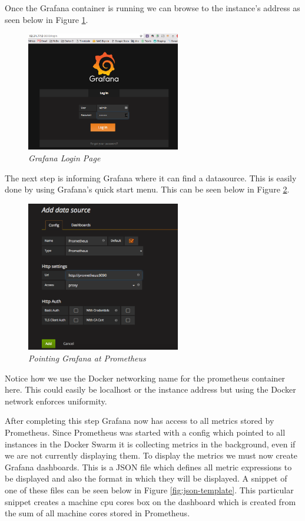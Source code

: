 Once the Grafana container is running we can browse to the instance's address as seen below in Figure \ref{fig:grafana}.

\begin{figure}[!h]
\centering
\includegraphics*[width=0.6\textwidth]{components/images/grafana}
\caption{\em Grafana Login Page}
\label{fig:grafana}
\end{figure}

The next step is informing Grafana where it can find a datasource. This is easily done by using Grafana's quick start menu. This can be seen below in Figure \ref{fig:add-source}.

\begin{figure}[!h]
\centering
\includegraphics*[width=0.6\textwidth]{components/images/add-source}
\caption{\em Pointing Grafana at Prometheus}
\label{fig:add-source}
\end{figure}

Notice how we use the Docker networking name for the prometheus container here. This could easily be localhost or the instance address but using the Docker network enforces uniformity.

After completing this step Grafana now has access to all metrics stored by Prometheus. Since Prometheus was started with a config which pointed to all instances in the Docker Swarm it is collecting metrics in the background, even if we are not currently displaying them. To display the metrics we must now create Grafana dashboards. This is a JSON file which defines all metric expressions to be displayed and also the format in which they will be displayed. A snippet of one of these files can be seen below in Figure \ref{fig:json-template}. This particular snippet creates a machine cpu cores box on the dashboard which is created from the sum of all machine cores stored in Prometheus.

